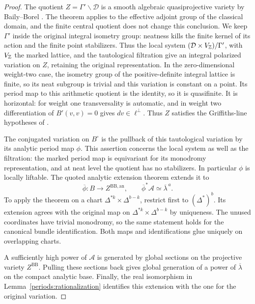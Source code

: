 \begin{proof}
The quotient $Z=\Gamma'\backslash\mathcal D$ is a smooth algebraic
quasiprojective variety by Baily--Borel
\cite[\S10, especially Theorem~10.11]{BailyBorel66}.  The theorem applies
to the effective adjoint group of the classical domain, and the finite
central quotient does not change this conclusion.  We keep $\Gamma'$
inside the original integral isometry group: neatness kills the finite
kernel of its action and the finite point stabilizers.  Thus the local
system $(\mathcal D\times V_{\mathbb Z})/\Gamma'$, with $V_{\mathbb Z}$ the marked
lattice, and the tautological
filtration give an integral polarized variation on $Z$, retaining the
original representation.  In the zero-dimensional weight-two case,
the isometry group of the positive-definite integral lattice is finite,
so its neat subgroup is trivial and this variation is constant on a
point.  Its period map to this
arithmetic quotient is the identity, so it is quasifinite.  It is
horizontal: for weight one transversality is automatic, and in weight
two differentiation of $B'(v,v)=0$ gives $dv\in\ell^\perp$.
Thus $Z$ satisfies the Griffiths-line hypotheses of
\cite[Theorems~5.2 and~5.5]{BFMT25}.

The conjugated variation on $B^\circ$ is the pullback of this tautological
variation by its analytic period map $\phi$.  This assertion concerns
the local system as well as the filtration: the marked period map is
equivariant for its monodromy representation, and at neat level the
quotient has no stabilizers.  In particular $\phi$ is locally liftable.
The quoted analytic extension theorem extends it to
\[
 \overline\phi:B\longrightarrow Z^{\mathrm{BB},\mathrm{an}},
 \qquad
 \overline\phi^*\mathcal A\simeq\overline\lambda^{\,a}.
\]
To apply the theorem on a chart $\Delta^{*k}\times\Delta^{b-k}$,
restrict first to $(\Delta^*)^b$.  Its extension agrees with the original
map on $\Delta^{*k}\times\Delta^{b-k}$ by uniqueness.  The unused
coordinates have trivial monodromy, so the same statement holds for the
canonical bundle identification.  Both maps and identifications glue
uniquely on overlapping charts.

A sufficiently high power of $\mathcal A$ is generated by global
sections on the projective variety $Z^{\mathrm{BB}}$.  Pulling these
sections back gives global generation of a power of $\overline\lambda$
on the compact analytic base.  Finally, the real isomorphism in
Lemma~\ref{periods:rationalization} identifies this extension with the
one for the original variation.
\end{proof}

